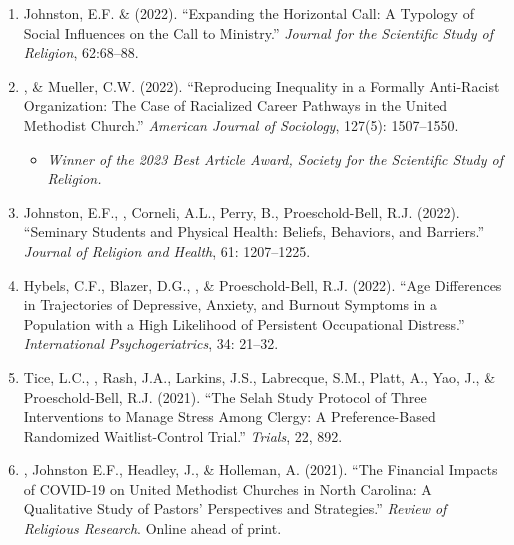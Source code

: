 \begin{enumerate}
\item Johnston, E.F. \& \Eagle  \hspace{.1em} (2022). ``Expanding the Horizontal Call: A Typology of Social Influences on the Call to Ministry.'' \emph{Journal for the Scientific Study of Religion}, 62:68--88.  

\item \Eagle, \& Mueller, C.W. \hspace{.1em} (2022). ``Reproducing Inequality in a Formally Anti-Racist Organization: The Case of Racialized Career Pathways in the United Methodist Church.'' \emph{American Journal of Sociology}, 127(5): 1507–1550.  \vspace{-.5em}
\begin{itemize}
	\item \textit{Winner of the 2023 Best Article Award, Society for the Scientific Study of Religion.}
\end{itemize}
\vspace{-.5em}

\item Johnston, E.F., \Eagle, Corneli, A.L., Perry, B., Proeschold-Bell, R.J.  (2022). ``Seminary Students and Physical Health: Beliefs, Behaviors, and Barriers.'' \emph{Journal of Religion and Health}, 61: 1207--1225. 

\item Hybels, C.F., Blazer, D.G., \Eagle, \& Proeschold-Bell, R.J. (2022). ``Age Differences in Trajectories of Depressive, Anxiety, and Burnout Symptoms in a Population with a High Likelihood of Persistent Occupational Distress.'' \emph{International Psychogeriatrics}, 34: 21--32. 

\item Tice, L.C., \Eagle, Rash, J.A., Larkins, J.S., Labrecque, S.M., Platt, A., Yao, J., \& Proeschold-Bell, R.J. (2021). ``The Selah Study Protocol of Three Interventions to Manage Stress Among Clergy: A Preference-Based Randomized Waitlist-Control Trial.''  \emph{Trials}, 22, 892. 

\item \Eagle, Johnston E.F., Headley, J., \& Holleman, A. (2021). ``The Financial Impacts of COVID-19 on United Methodist Churches in North Carolina: A Qualitative Study of Pastors’ Perspectives and Strategies.'' \emph{Review of Religious Research}. Online ahead of print. 


\end{enumerate}
